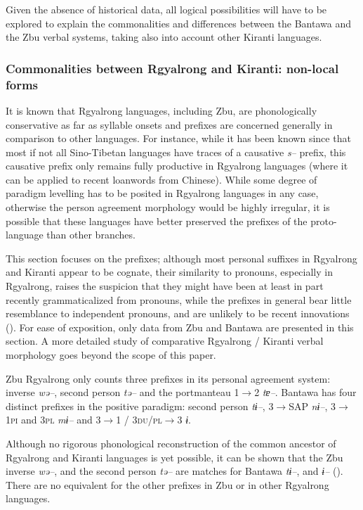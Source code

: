 \documentclass[twoside,a4paper,11pt]{article}
\newcommand{\ipa}[1]{{\phon\textit{#1}}}
\newcommand{\Σ}{\greek{Σ}}
\begin{document}
Given the absence of historical data, all logical possibilities will have to be explored to explain the commonalities and differences between the Bantawa and the Zbu verbal systems, taking also into account other Kiranti languages.




\subsubsection{Commonalities between Rgyalrong and Kiranti: non-local forms}

It is known that  Rgyalrong languages, including Zbu, are   phonologically conservative as far as syllable onsets and prefixes are concerned generally in comparison to other languages. For instance, while it has been known since \citet{conrady1896} that most if not all Sino-Tibetan languages have  traces of a causative \ipa{s--} prefix, this causative prefix only remains fully productive in Rgyalrong languages (where it can be applied to recent loanwords from Chinese). While some degree of paradigm levelling has to be posited in Rgyalrong languages in any case, otherwise the person agreement morphology would be highly irregular, it is possible that these languages have better preserved the prefixes of the proto-language than other branches.

This section focuses on the   prefixes; although most personal suffixes in Rgyalrong and Kiranti appear to be cognate, their similarity to pronouns, especially in Rgyalrong, raises the suspicion that they might have been at least in part recently  grammaticalized from pronouns, while the prefixes in general bear little resemblance to independent pronouns, and are unlikely to be recent innovations (\citealt{jacques12agreement}).   For ease of exposition, only data from Zbu and Bantawa are presented in this section. A more detailed study of comparative Rgyalrong / Kiranti verbal morphology goes beyond the scope of this paper.

Zbu Rgyalrong only counts three prefixes in its personal agreement system:   inverse   \ipa{wə--},   second person   \ipa{tə--}  and the portmanteau 1$\rightarrow$2   \ipa{tɐ--}. Bantawa has four distinct prefixes in the positive paradigm:   second person \ipa{tɨ--},   3$\rightarrow$SAP \ipa{nɨ--}, 3$\rightarrow$\textsc{1pi} and \textsc{3pl} \ipa{mɨ--} and 3$\rightarrow$1 / \textsc{3du/pl}$\rightarrow$3 \ipa{ɨ}. 


Although no rigorous phonological reconstruction of the common ancestor of Rgyalrong and Kiranti languages is yet possible,  it can be shown that  the Zbu inverse  \ipa{wə--}, and the  second person   \ipa{tə--}  are matches for Bantawa \ipa{tɨ--},  and \ipa{ɨ--} (\citealt{jacques12agreement}). There are no equivalent for the other prefixes in Zbu or in other Rgyalrong languages.
\end{document}
